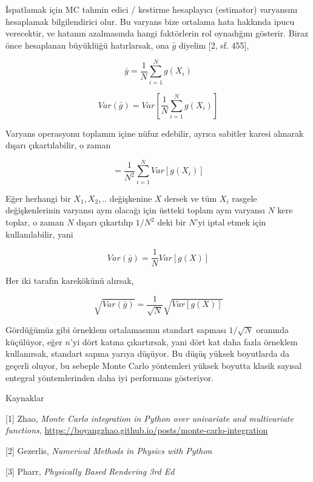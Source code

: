 \documentclass[12pt,fleqn]{article}\usepackage{../../common}
\begin{document}
İspatlamak için MC tahmin edici / kestirme hesaplayıcı (estimator) varyansını
hesaplamak bilgilendirici olur. Bu varyans bize ortalama hata hakkında ipucu
verecektir, ve hatanın azalmasında hangi faktörlerin rol oynadığını
gösterir. Biraz önce hesaplanan büyüklüğü hatırlarsak, ona $\bar{g}$
diyelim [2, sf. 455],

$$
\bar{g} = \frac{1}{N} \sum_{i=1}^{N} g(X_i)
$$

$$
Var(\bar{g}) = Var \left[ \frac{1}{N} \sum_{i=1}^{N} g(X_i)  \right]
$$

Varyans operasyonu toplamın içine nüfuz edebilir, ayrıca sabitler karesi
alınarak dışarı çıkartılabilir, o zaman

$$
= \frac{1}{N^2} \sum_{i=1}^{N} Var[ g(X_i)]  
$$

Eğer herhangi bir $X_1,X_2,..$ değişkenine $X$ dersek ve tüm $X_i$ rasgele
değişkenlerinin varyansı aynı olacağı için üstteki toplam aynı varyansı $N$
kere toplar, o zaman $N$ dışarı çıkartılıp $1/N^2$ deki bir $N$'yi iptal etmek
için kullanılabilir, yani 

$$
Var(\bar{g}) = \frac{1}{N} Var[ g(X)]  
$$

Her iki tarafın karekökünü alırsak,

$$
\sqrt{Var(\bar{g})} = \frac{1}{\sqrt{N}} \sqrt{Var[ g(X)]}
$$

Gördüğümüz gibi örneklem ortalamasının standart sapması $1/\sqrt{N}$ oranında
küçülüyor, eğer $n$'yi dört katına çıkartırsak, yani dört kat daha fazla
örneklem kullanırsak, standart sapma yarıya düşüyor. Bu düşüş yüksek boyutlarda
da geçerli oluyor, bu sebeple Monte Carlo yöntemleri yüksek boyutta klasik
sayısal entegral yöntemlerinden daha iyi performans gösteriyor.

Kaynaklar

[1] Zhao, {\em Monte Carlo integration in Python over univariate and multivariate functions},
    \url{https://boyangzhao.github.io/posts/monte-carlo-integration}

[2] Gezerlis, {\em Numerical Methods in Physics with Python}
    
[3] Pharr, {\em Physically Based Rendering 3rd Ed}
\end{document}
